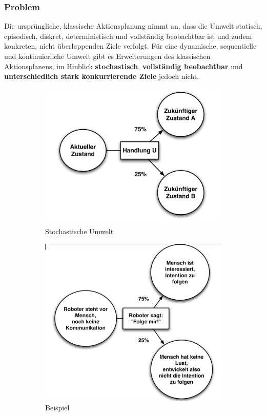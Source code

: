 \subsubsection{Problem}
Die urspr\"ungliche, klassische Aktionsplanung nimmt an, dass die Umwelt statisch, episodisch, diskret, deterministisch und vollst\"andig beobachtbar ist und zudem konkreten, nicht \"uberlappenden Ziele verfolgt. 
F\"ur eine dynamische, sequentielle und kontinuierliche Umwelt gibt es Erweiterungen des klassischen Aktionsplanens, im Hinblick \textbf{stochastisch}, \textbf{vollst\"andig beobachtbar} und \textbf{unterschiedlich stark konkurrierende Ziele} jedoch nicht.
%
\begin{figure}[ht]
	\centering 
	\begin{subfigure}{.45\textwidth}
		\includegraphics[width=\textwidth]{figures/ch07_stochastischeUmwelt.png}
		\caption{Stochastische Umwelt}
		\label{ch07_stumwelt}
	\end{subfigure}
	\begin{subfigure}{.4\textwidth}
		\includegraphics[width=\textwidth]{figures/ch07_umwelt-bsp.png}
		\caption{Beispiel}
		\label{ch07_umwelt-bsp}
	\end{subfigure}
	\caption{}
\end{figure}


